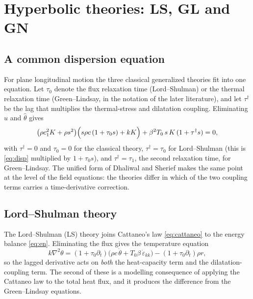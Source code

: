 \section{Hyperbolic theories: LS, GL and GN}\label{sec:hyperbolic}
\subsection{A common dispersion equation}
For plane longitudinal motion the three classical generalized theories fit into one equation. Let $\tau_0$ denote the flux relaxation time (Lord--Shulman) or the thermal relaxation time (Green--Lindsay, in the notation of the later literature), and let $\tau^\dagger$ be the lag that multiplies the thermal-stress and dilatation coupling. Eliminating $\hat u$ and $\hat\theta$ gives
\begin{equation}
\bigl(\rho c_1^2K+\rho s^2\bigr)\Bigl(s\rho c\,(1+\tau_0s)+kK\Bigr)+\beta^2T_0\,s\,K\,(1+\tau^\dagger s)=0,\label{eq:unified}
\end{equation}
with $\tau^\dagger=0$ and $\tau_0=0$ for the classical theory, $\tau^\dagger=\tau_0$ for Lord--Shulman (this is \eqref{eq:disp} multiplied by $1+\tau_0s$), and $\tau^\dagger=\tau_1$, the second relaxation time, for Green--Lindsay. The unified form of Dhaliwal and Sherief \citep{Dhaliwal1980} makes the same point at the level of the field equations: the theories differ in which of the two coupling terms carries a time-derivative correction.

\subsection{Lord--Shulman theory}\label{sec:ls}
The Lord--Shulman (LS) theory joins Cattaneo's law \eqref{eq:cattaneo} to the energy balance \eqref{eq:en}. Eliminating the flux gives the temperature equation
\begin{equation}
k\nabla^2\theta=(1+\tau_0\partial_t)\bigl(\rho c\,\dot\theta+T_0\beta\,\dot\varepsilon_{kk}\bigr)-(1+\tau_0\partial_t)\rho r, \label{eq:LS}
\end{equation}
so the lagged derivative acts on \emph{both} the heat-capacity term and the dilatation-coupling term. The second of these is a modelling consequence of applying the Cattaneo law to the total heat flux, and it produces the difference from the Green--Lindsay equations.

